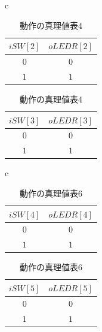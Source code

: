 \documentclass[a4paper]{jarticle}
\begin{document}
\begin{table}[!h]
	\begin{center}
		\begin{tabular}{c}
			\begin{minipage}{0.5\hsize}
				\begin{center}
					\caption{動作の真理値表3}
					\label{Work1TruthTable3}
					\begin{tabular}{|c|c|}
						\hline
						$iSW[2]$	&$oLEDR[2]$\\	\hline\hline
						$0$		&$0$\\		\hline
						$1$		&$1$\\		\hline
					\end{tabular}
				\end{center}
			\end{minipage}
			\begin{minipage}{0.5\hsize}
				\begin{center}
					\caption{動作の真理値表4}
					\label{Work1TruthTable4}
					\begin{tabular}{|c|c|}
						\hline
						$iSW[3]$	&$oLEDR[3]$\\	\hline\hline
						$0$		&$0$\\		\hline
						$1$		&$1$\\		\hline
					\end{tabular}
				\end{center}
			\end{minipage}
		\end{tabular}
	\end{center}
\end{table}
\begin{table}[!h]
	\begin{center}
		\begin{tabular}{c}
			\begin{minipage}{0.5\hsize}
				\begin{center}
					\caption{動作の真理値表5}
					\label{Work1TruthTable5}
					\begin{tabular}{|c|c|}
						\hline
						$iSW[4]$	&$oLEDR[4]$\\	\hline\hline
						$0$		&$0$\\		\hline
						$1$		&$1$\\		\hline
					\end{tabular}
				\end{center}
			\end{minipage}
			\begin{minipage}{0.5\hsize}
				\begin{center}
					\caption{動作の真理値表6}
					\label{Work2TruthTable6}
					\begin{tabular}{|c|c|}
						\hline
						$iSW[5]$	&$oLEDR[5]$\\	\hline\hline
						$0$		&$0$\\		\hline
						$1$		&$1$\\		\hline
					\end{tabular}
				\end{center}
			\end{minipage}
		\end{tabular}
	\end{center}
\end{table}
\end{document}
